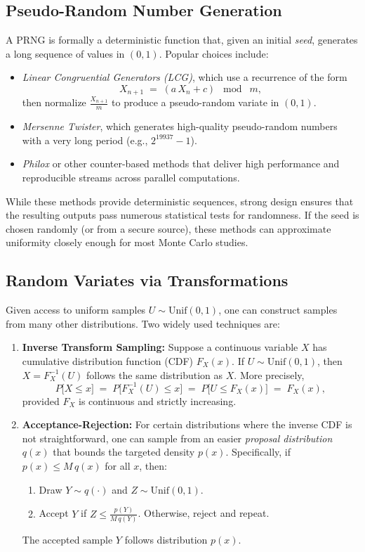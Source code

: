 \subsection{Pseudo-Random Number Generation}
A PRNG is formally a deterministic function that, given an initial \emph{seed}, generates a long sequence of values in \((0,1)\). Popular choices include:
\begin{itemize}
\item \emph{Linear Congruential Generators (LCG)}, which use a recurrence of the form
\[
X_{n+1}
\;=\;
(a\,X_n + c)
\;\bmod\; m,
\]
then normalize \(\frac{X_{n+1}}{m}\) to produce a pseudo-random variate in \((0,1)\).
\item \emph{Mersenne Twister}, which generates high-quality pseudo-random numbers with a very long period (e.g., \(2^{19937}-1\)).
\item \emph{Philox} or other counter-based methods that deliver high performance and reproducible streams across parallel computations.
\end{itemize}

While these methods provide deterministic sequences, strong design ensures that the resulting outputs pass numerous statistical tests for randomness. If the seed is chosen randomly (or from a secure source), these methods can approximate uniformity closely enough for most Monte Carlo studies.

\subsection*{Random Variates via Transformations}
Given access to uniform samples \(U\sim \mathrm{Unif}(0,1)\), one can construct samples from many other distributions. Two widely used techniques are:

\begin{enumerate}
\item \textbf{Inverse Transform Sampling:}  
   Suppose a continuous variable \(X\) has cumulative distribution function (CDF) \(F_X(x)\). If \(U\sim \mathrm{Unif}(0,1)\), then \(X=F_X^{-1}(U)\) follows the same distribution as \(X\). More precisely,
   \[
   P\bigl[X \le x\bigr]
   \;=\;
   P\bigl[F_X^{-1}(U)\le x\bigr]
   \;=\;
   P\bigl[U \le F_X(x)\bigr]
   \;=\;
   F_X(x),
   \]
   provided \(F_X\) is continuous and strictly increasing.  

\item \textbf{Acceptance-Rejection:}  
   For certain distributions where the inverse CDF is not straightforward, one can sample from an easier \emph{proposal distribution} \(q(x)\) that bounds the targeted density \(p(x)\). Specifically, if \(p(x)\le M\,q(x)\) for all \(x\), then:
   \begin{enumerate}
   \item Draw \(Y\sim q(\cdot)\) and \(Z\sim \mathrm{Unif}(0,1)\).
   \item Accept \(Y\) if \(Z\le \frac{p(Y)}{M\,q(Y)}\). Otherwise, reject and repeat.
   \end{enumerate}
   The accepted sample \(Y\) follows distribution \(p(x)\).  
\end{enumerate}

